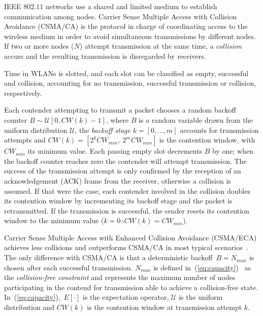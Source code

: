 IEEE $802.11$ networks use a shared and limited medium to establish communication among nodes. Carrier Sense Multiple Access with Collision Avoidance (CSMA/CA) is the protocol in charge of coordinating access to the wireless medium in order to avoid simultaneous transmissions by different nodes. If two or more nodes ($N$) attempt transmission at the same time, a \emph{collision} accurs and the resulting transmission is disregarded by receivers.

Time in WLANs is slotted, and each slot can be classified as empty, successful and collision, accounting for no transmission, successful transmission or collision, respectively.

Each contender attempting to transmit a packet chooses a random backoff counter $B\sim\mathcal{U}[0,CW(k)-1]$, where $B$ is a random variable drawn from the uniform distribution $\mathcal{U}$, the \emph{backoff stage} $k=[0,\ldots,m]$ accounts for transmission attempts and $CW(k)=[2^{k}CW_{min},~2^{m}CW_{min}]$ is the contention window, with $CW_{min}$ its minimum value. Each passing empty slot decrements $B$ by one; when the backoff counter reaches zero the contender will attempt transmission. The success of the transmission attempt is only confirmed by the reception of an acknowledgement (ACK) frame from the receiver, otherwise a collision is assumed. If that were the case, each contender involved in the collision doubles its contention window by incrementing its backoff stage and the packet is retransmitted. If the transmission is successful, the sender resets its contention window to the minimum value ($k=0\therefore CW(k)=CW_{min}$).


Carrier Sense Multiple Access with Enhanced Collision Avoidance (CSMA/ECA) achieves less collisions and outperforms CSMA/CA in most typical scenarios~\cite{CSMA_ECA}. The only difference with CSMA/CA is that a deterministic backoff~$B=N_{max}$ is chosen after each successful transmission. $N_{max}$ is defined in~(\ref{eq:capacity})~\cite{CSMA_ECA} as the \emph{collision-free constraint} and represents the maximum number of nodes participating in the contend for transmission able to achieve a collision-free state. In~(\ref{eq:capacity}),~$E[\cdotp]$ is the expectation operator, $\mathcal{U}$ is the uniform distribution and $CW(k)$ is the contention window at transmission attempt $k$.

